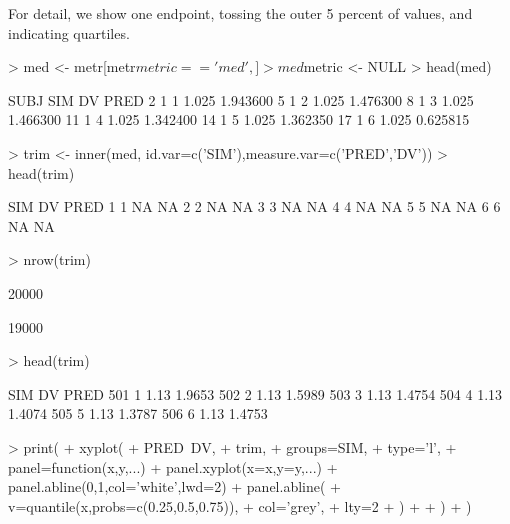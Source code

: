 For detail, we show one endpoint, tossing the outer 5 percent of values, and 
indicating quartiles.
\begin{Schunk}
\begin{Sinput}
> med <- metr[metr$metric=='med',]
> med$metric <- NULL
> head(med)
\end{Sinput}
\begin{Soutput}
   SUBJ SIM    DV     PRED
2     1   1 1.025 1.943600
5     1   2 1.025 1.476300
8     1   3 1.025 1.466300
11    1   4 1.025 1.342400
14    1   5 1.025 1.362350
17    1   6 1.025 0.625815
\end{Soutput}
\begin{Sinput}
> trim <- inner(med, id.var=c('SIM'),measure.var=c('PRED','DV'))
> head(trim)
\end{Sinput}
\begin{Soutput}
  SIM DV PRED
1   1 NA   NA
2   2 NA   NA
3   3 NA   NA
4   4 NA   NA
5   5 NA   NA
6   6 NA   NA
\end{Soutput}
\begin{Sinput}
> nrow(trim)
\end{Sinput}
\begin{Soutput}
[1] 20000
\end{Soutput}
\begin{Soutput}
[1] 19000
\end{Soutput}
\begin{Sinput}
> head(trim)
\end{Sinput}
\begin{Soutput}
    SIM   DV   PRED
501   1 1.13 1.9653
502   2 1.13 1.5989
503   3 1.13 1.4754
504   4 1.13 1.4074
505   5 1.13 1.3787
506   6 1.13 1.4753
\end{Soutput}
\begin{Sinput}
> print(
+ 	xyplot(
+ 		PRED~DV,
+ 		trim,
+ 		groups=SIM,
+ 		type='l',
+ 		panel=function(x,y,...){
+ 			panel.xyplot(x=x,y=y,...)
+ 			panel.abline(0,1,col='white',lwd=2)
+ 			panel.abline(
+ 				v=quantile(x,probs=c(0.25,0.5,0.75)),
+ 				col='grey',
+ 				lty=2
+ 			)
+ 		}
+ 	)
+ )
\end{Sinput}
\end{Schunk}
